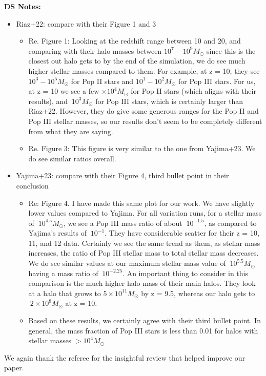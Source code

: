\documentclass[11pt]{article}
\begin{document}
\textbf{DS Notes:}
\begin{itemize}
    \item Riaz+22: compare with their Figure 1 and 3
    \begin{itemize}
        \item Re. Figure 1: Looking at the redshift range between 10 and 20, and comparing with their halo masses between $10^7 - 10^9 M_\odot$ since this is the closest out halo gets to by the end of the simulation, we do see much higher stellar masses compared to them. For example, at z = 10, they see $10^3 - 10^5 M_\odot$ for Pop II stars and $10^1 - 10^2 M_\odot$ for Pop III stars. For us, at z = 10 we see a few $\times 10^4 M_\odot$ for Pop II stars (which aligns with their results), and $~10^{3} M_{\odot}$ for Pop III stars, which is certainly larger than Riaz+22. However, they do give some generous ranges for the Pop II and Pop III stellar masses, so our results don't seem to be completely different from what they are saying.
        \item Re. Figure 3: This figure is very similar to the one from Yajima+23. We do see similar ratios overall.
    \end{itemize}
    \item Yajima+23: compare with their Figure 4, third bullet point in their conclusion
    \begin{itemize}
        \item Re: Figure 4. I have made this same plot for our work. We have slightly lower values compared to Yajima. For all variation runs, for a stellar mass of $~10^{4.5} M_\odot$, we see a Pop III mass ratio of about $~10^{-1.5}$, as compared to Yajima's results of $~10^{-1}$. They have considerable scatter for their z = 10, 11, and 12 data. Certainly we see the same trend as them, as stellar mass increases, the ratio of Pop III stellar mass to total stellar mass decreases. We do see similar values at our maximum stellar mass value of $~10^{5.5} M_\odot$ having a mass ratio of $~10^{-2.25}$. An important thing to consider in this comparison is the much higher halo mass of their main halos. They look at a halo that grows to $5 \times 10^{11} M_\odot$ by z = 9.5, whereas our halo gets to $~2 \times 10^{8} M_\odot$ at z = 10.
        \item Based on these results, we certainly agree with their third bullet point. In general, the mass fraction of Pop III stars is less than 0.01 for halos with stellar masses $> 10^{4} M_\odot$ 
    \end{itemize}
\end{itemize}

We again thank the referee for the insightful review that helped
improve our paper.



\end{document}
